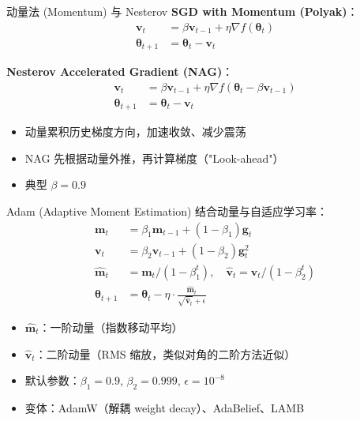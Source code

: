 \documentclass[11pt, aspectratio=169, svgnames, table, fontset=fandol]{ctexbeamer}
\begin{document}
\begin{frame}{动量法 (Momentum) 与 Nesterov}
  \textbf{SGD with Momentum (Polyak)}：
  \begin{align*}
    \bm{v}_{t} &= \beta \bm{v}_{t-1} + \eta \nabla f(\bm{\theta}_t) \\
    \bm{\theta}_{t+1} &= \bm{\theta}_t - \bm{v}_t
  \end{align*}

  \textbf{Nesterov Accelerated Gradient (NAG)}：
  \begin{align*}
    \bm{v}_{t} &= \beta \bm{v}_{t-1} + \eta \nabla f(\bm{\theta}_t - \beta \bm{v}_{t-1}) \\
    \bm{\theta}_{t+1} &= \bm{\theta}_t - \bm{v}_t
  \end{align*}

  \begin{itemize}
    \item 动量累积历史梯度方向，加速收敛、减少震荡
    \item NAG 先根据动量外推，再计算梯度（"Look-ahead"）
    \item 典型 $\beta = 0.9$
  \end{itemize}
\end{frame}

\begin{frame}{Adam (Adaptive Moment Estimation)}
  结合动量与自适应学习率：
  \begin{align*}
    \bm{m}_t &= \beta_1 \bm{m}_{t-1} + (1-\beta_1) \bm{g}_t \\
    \bm{v}_t &= \beta_2 \bm{v}_{t-1} + (1-\beta_2) \bm{g}_t^2 \\
    \hat{\bm{m}}_t &= \bm{m}_t / (1-\beta_1^t),\quad \hat{\bm{v}}_t = \bm{v}_t / (1-\beta_2^t) \\
    \bm{\theta}_{t+1} &= \bm{\theta}_t - \eta \cdot \frac{\hat{\bm{m}}_t}{\sqrt{\hat{\bm{v}}_t} + \epsilon}
  \end{align*}

  \begin{itemize}
    \item $\hat{\bm{m}}_t$：一阶动量（指数移动平均）
    \item $\hat{\bm{v}}_t$：二阶动量（RMS 缩放，类似对角的二阶方法近似）
    \item 默认参数：$\beta_1=0.9$, $\beta_2=0.999$, $\epsilon=10^{-8}$
    \item 变体：AdamW（解耦 weight decay）、AdaBelief、LAMB
  \end{itemize}
\end{frame}
\end{document}
